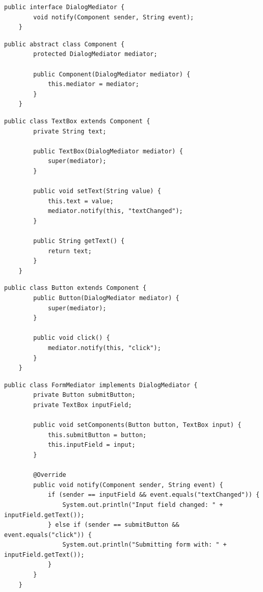 \begin{lstlisting}[style=JavaStyle, caption={Antarmuka Mediator}]
	public interface DialogMediator {
		void notify(Component sender, String event);
	}
\end{lstlisting}

\begin{lstlisting}[style=JavaStyle, caption={Kelas Komponen Umum}]
	public abstract class Component {
		protected DialogMediator mediator;
		
		public Component(DialogMediator mediator) {
			this.mediator = mediator;
		}
	}
\end{lstlisting}

\begin{lstlisting}[style=JavaStyle, caption={Komponen TextBox}]
	public class TextBox extends Component {
		private String text;
		
		public TextBox(DialogMediator mediator) {
			super(mediator);
		}
		
		public void setText(String value) {
			this.text = value;
			mediator.notify(this, "textChanged");
		}
		
		public String getText() {
			return text;
		}
	}
\end{lstlisting}

\begin{lstlisting}[style=JavaStyle, caption={Komponen Button}]
	public class Button extends Component {
		public Button(DialogMediator mediator) {
			super(mediator);
		}
		
		public void click() {
			mediator.notify(this, "click");
		}
	}
\end{lstlisting}

\begin{lstlisting}[style=JavaStyle, caption={Mediator Konkret}]
	public class FormMediator implements DialogMediator {
		private Button submitButton;
		private TextBox inputField;
		
		public void setComponents(Button button, TextBox input) {
			this.submitButton = button;
			this.inputField = input;
		}
		
		@Override
		public void notify(Component sender, String event) {
			if (sender == inputField && event.equals("textChanged")) {
				System.out.println("Input field changed: " + inputField.getText());
			} else if (sender == submitButton && event.equals("click")) {
				System.out.println("Submitting form with: " + inputField.getText());
			}
		}
	}
\end{lstlisting}


